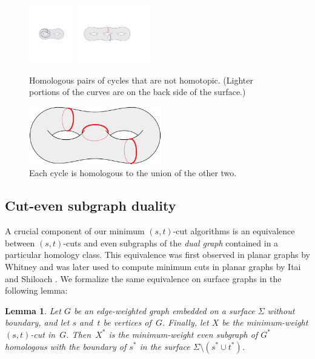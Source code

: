 \documentclass[11pt,twoside]{article}
\def\Cut{X}
\newtheorem{lemma}[theorem]{Lemma}
\begin{document}
\begin{figure}[htb]
\centering
\includegraphics[height=1in]{Fig/homologous3}\qquad
\includegraphics[height=1in]{Fig/homologous2}
\caption{Homologous pairs of cycles that are not homotopic.  (Lighter portions of the curves are on the back side of the surface.)}
\label{fig:homology}
\end{figure}

\begin{figure}[htb]
\centering
\includegraphics[height=1in]{Fig/homologous1}
\caption{Each cycle is homologous to the union of the other two.}
\label{fig:homology2}
\end{figure}

\subsection{Cut-even subgraph duality}
\label{SS:duality}


A crucial component of our minimum $(s,t)$-cut algorithms is an equivalence between $(s,t)$-cuts and even subgraphs of the \emph{dual graph} contained in a particular homology class.  This equivalence was first observed in planar graphs by Whitney \cite{w-pg-33} and was later used to compute minimum cuts in planar graphs by Itai and Shiloach \cite{is-mfpn-79}.
We formalize the same equivalence on surface graphs in the following lemma:

\begin{lemma}
\label{lem:cut-duality}
Let $G$ be an edge-weighted graph embedded on a surface $\Sigma$ without boundary, and let $s$ and~$t$ be vertices of~$G$.  Finally, let $\Cut$ be the minimum-weight $(s,t)$-cut in~$G$.  Then~$\Cut^*$ is the minimum-weight even subgraph of $G^*$ homologous with the boundary of $s^*$ in the surface $\Sigma\setminus(s^*\cup t^*)$.
\end{lemma}
\end{document}
